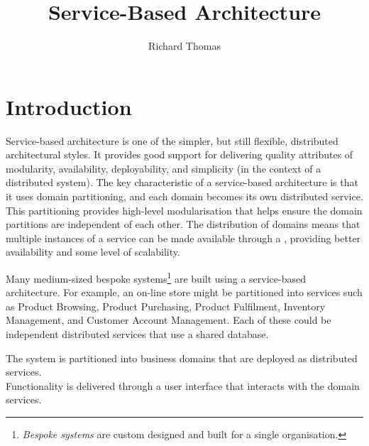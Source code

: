 \title{Service-Based Architecture}
\author{Richard Thomas}
\date{}

\maketitle

\section{Introduction}

Service-based architecture is one of the simpler, but still flexible, distributed architectural styles.
It provides good support for delivering quality attributes of modularity, availability, deployability, and simplicity (in the context of a distributed system).
The key characteristic of a service-based architecture is that it uses domain partitioning, and each domain becomes its own distributed service.
This partitioning provides high-level modularisation that helps ensure the domain partitions are independent of each other.
The distribution of domains means that multiple instances of a service can be made available through a 
,
providing better availability and some level of scalability.

Many medium-sized bespoke systems\footnote{\emph{Bespoke systems} are custom designed and built for a single organisation.}
are built using a service-based architecture.
For example, an on-line store might be partitioned into services such as Product Browsing,
Product Purchasing, Product Fulfilment, Inventory Management, and Customer Account Management.
Each of these could be independent distributed services that use a shared database.

\vspace{2mm}
\begin{definition}
    The system is partitioned into business domains that are deployed as distributed services.\\
    Functionality is delivered through a user interface that interacts with the domain services.
\end{definition}

